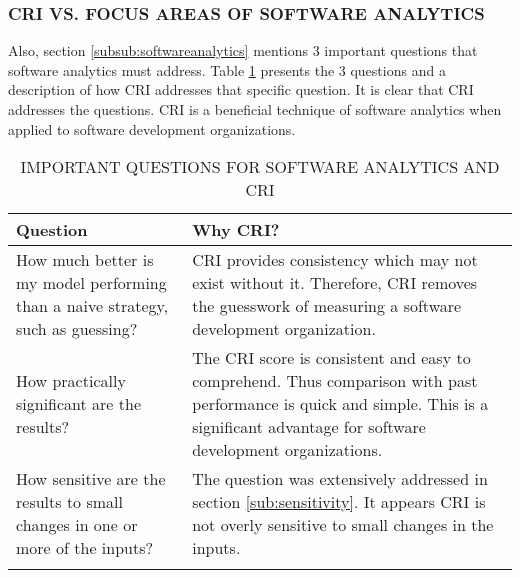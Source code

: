 \documentclass[SDSUThesis.tex]{subfiles}
\begin{document}
        
        \subsubsection{CRI VS. FOCUS AREAS OF SOFTWARE ANALYTICS}
            Also, section \ref{subsub:softwareanalytics} mentions 3 important questions that
            software analytics must address.  Table \ref{tab:questions} presents the 3 questions
            and a description of how CRI addresses that specific question.  It is clear
            that CRI addresses the questions.  CRI is a beneficial technique of software
            analytics when applied to software development organizations.
        
            \begin{longtable}{p{4cm}p{10cm}}
                
                \toprule%
                 \centering%
                 {\bfseries Question}
                 & {\bfseries Why CRI?} \\
                
                \cmidrule[0.4pt](r{0.125em}){1-1}%
                \cmidrule[0.4pt](lr{0.125em}){2-2}%
                \endhead
                
                How much better is my model performing than a naive strategy, such as guessing? & CRI 
                provides consistency which may not exist without it.  Therefore, CRI removes the 
                guesswork of measuring a software development organization. \\
                \myrowcolour%
                How practically significant are the results? & The CRI score is consistent
                and easy to comprehend.  Thus comparison with past performance is quick 
                and simple.  This is a significant advantage for software 
                development organizations. \\
                How sensitive are the results to small changes in one or more of the inputs? & 
                The question was extensively addressed in section \ref{sub:sensitivity}.  It appears CRI is
                not overly sensitive to small changes in the inputs.\\
                
                \bottomrule
                
                \caption{IMPORTANT QUESTIONS FOR SOFTWARE ANALYTICS AND CRI}
                \label{tab:questions}
            \end{longtable}
\end{document}
